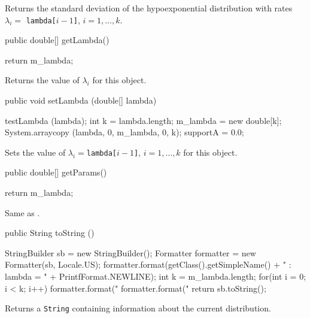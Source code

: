 \begin{tabb}  Returns the standard deviation
of the hypoexponential distribution  with rates $\lambda_i = $
\texttt{lambda[$i-1$]}, $i = 1,\ldots,k$.
\end{tabb}
\begin{htmlonly}
\end{htmlonly}
\begin{code}

   public double[] getLambda()\begin{hide} {
      return m_lambda;
   }
\end{hide}
\end{code}
  \begin{tabb}
  Returns the value of $\lambda_i$ for this object.
 \end{tabb}
\begin{code}

   public void setLambda (double[] lambda)\begin{hide} {
      testLambda (lambda);
      int k = lambda.length;
      m_lambda = new double[k];
      System.arraycopy (lambda, 0, m_lambda, 0, k);
      supportA = 0.0;
   }\end{hide}
\end{code}
  \begin{tabb}
  Sets the value of $\lambda_i = $\texttt{lambda[$i-1$]},
 $i = 1,\ldots,k$ for this object.
 \end{tabb}
\begin{code}

   public double[] getParams()\begin{hide} {
      return m_lambda;
   }\end{hide}
\end{code}
\begin{tabb}
   Same as .
\end{tabb}
\begin{hide}\begin{code}

   public String toString ()\begin{hide} {
      StringBuilder sb = new StringBuilder();
      Formatter formatter = new Formatter(sb, Locale.US);
      formatter.format(getClass().getSimpleName() + " : lambda = {" +
           PrintfFormat.NEWLINE);
      int k = m_lambda.length;
      for(int i = 0; i < k; i++) {
         formatter.format("   %
      }
      formatter.format("}%
      return sb.toString();
   }\end{hide}
\end{code}
\begin{tabb}
   Returns a \texttt{String} containing information about the current
  distribution.
\end{tabb}
\end{hide}

\begin{code}\begin{hide}
}\end{hide}
\end{code}

